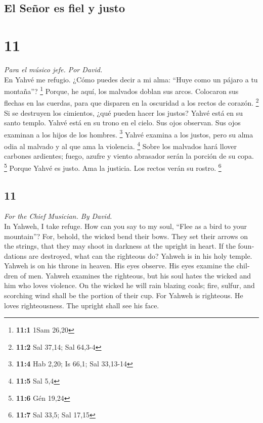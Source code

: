 \begin{paracol}{2}
\hypertarget{el-seuxf1or-es-fiel-y-justo}{%
\subsection{El Señor es fiel y
justo}\label{el-seuxf1or-es-fiel-y-justo}}

\hypertarget{section-20}{%
\section{11}\label{section-20}}

\emph{Para el músico jefe. Por David.}\\
 En Yahvé me refugio. ¿Cómo puedes decir a mi alma: ``Huye
como un pájaro a tu montaña''? \footnote{\textbf{11:1} 1Sam 26,20}
 Porque, he aquí, los malvados doblan sus arcos. Colocaron
sus flechas en las cuerdas, para que disparen en la oscuridad a los
rectos de corazón. \footnote{\textbf{11:2} Sal 37,14; Sal 64,3-4}
 Si se destruyen los cimientos, ¿qué pueden hacer los
justos?  Yahvé está en su santo templo. Yahvé está en su
trono en el cielo. Sus ojos observan. Sus ojos examinan a los hijos de
los hombres. \footnote{\textbf{11:4} Hab 2,20; Is 66,1; Sal 33,13-14}
 Yahvé examina a los justos, pero su alma odia al malvado
y al que ama la violencia. \footnote{\textbf{11:5} Sal 5,4}
 Sobre los malvados hará llover carbones ardientes; fuego,
azufre y viento abrasador serán la porción de su copa. \footnote{\textbf{11:6}
  Gén 19,24}  Porque Yahvé es justo. Ama la justicia. Los
rectos verán su rostro. \footnote{\textbf{11:7} Sal 33,5; Sal 17,15}

\switchcolumn
\begin{otherlanguage}{english}

\hypertarget{section-21}{%
\section{11}\label{section-21}}

\emph{For the Chief Musician. By David.}\\
 In Yahweh, I take refuge. How can you say to my soul,
``Flee as a bird to your mountain''?  For, behold, the
wicked bend their bows. They set their arrows on the strings, that they
may shoot in darkness at the upright in heart.  If the
foundations are destroyed, what can the righteous do? 
Yahweh is in his holy temple. Yahweh is on his throne in heaven. His
eyes observe. His eyes examine the children of men. 
Yahweh examines the righteous, but his soul hates the wicked and him who
loves violence.  On the wicked he will rain blazing coals;
fire, sulfur, and scorching wind shall be the portion of their cup.
 For Yahweh is righteous. He loves righteousness. The
upright shall see his face.


\end{otherlanguage}
\end{paracol}
